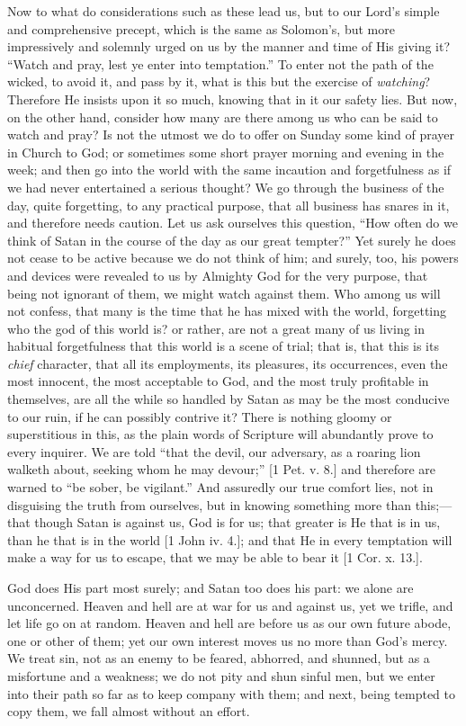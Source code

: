 Now to what do considerations such as these lead us, but to our
Lord's simple and comprehensive precept, which is the same as
Solomon's, but more impressively and solemnly urged on us by the
manner and time of His giving it? ``Watch and pray, lest ye enter
into temptation.'' To enter not the path of the wicked, to avoid
it, and pass by it, what is this but the exercise of \emph{watching}?
Therefore He insists upon it so much, knowing that in it our safety
lies. But now, on the other hand, consider how many are there among us
who can be said to watch and pray? Is not the utmost we do to offer on
Sunday some kind of prayer in Church to God; or sometimes some short
prayer morning and evening in the week; and then go into the world
with the same incaution and forgetfulness as if we had never
entertained a serious thought? We go through the business of the day,
quite forgetting, to any practical purpose, that all business has
snares in it, and therefore needs caution. Let us ask ourselves this
question, ``How often do we think of Satan in the course of the
day as our great tempter?'' Yet surely he does not cease to be
active because we do not think of him; and surely, too, his powers and
devices were revealed to us by Almighty God for the very purpose, that
being not ignorant of them, we might watch against them. Who among us
will not confess, that many is the time that he has mixed with the
world, forgetting who the god of this world is? or rather, are not a
great many of us living in habitual forgetfulness that this world is a
scene of trial; that is, that this is its \emph{chief} character, that
all its employments, its pleasures, its occurrences, even the most
innocent, the most acceptable to God, and the most truly profitable in
themselves, are all the while so handled by Satan as may be the most
conducive to our ruin, if he can possibly contrive it? There is
nothing gloomy or superstitious in this, as the plain words of
Scripture will abundantly prove to every inquirer. We are told
``that the devil, our adversary, as a roaring lion walketh about,
seeking whom he may devour;'' [1 Pet. v. 8.] and therefore are
warned to ``be sober, be vigilant.'' And assuredly our true
comfort lies, not in disguising the truth from ourselves, but in
knowing something more than this;—that though Satan is against us,
God is for us; that greater is He that is in us, than he that is in
the world [1 John iv. 4.]; and that He in every temptation will make a way for us to
escape, that we may be able to bear it [1 Cor. x. 13.].

God does His part most surely; and Satan too does his part: we
alone are unconcerned. Heaven and hell are at war for us and against
us, yet we trifle, and let life go on at random. Heaven and hell are
before us as our own future abode, one or other of them; yet our own
interest moves us no more than God's mercy. We treat sin, not as an
enemy to be feared, abhorred, and shunned, but as a misfortune and a
weakness; we do not pity and shun sinful men, but we enter into their
path so far as to keep company with them; and next, being tempted to
copy them, we fall almost without an effort.

